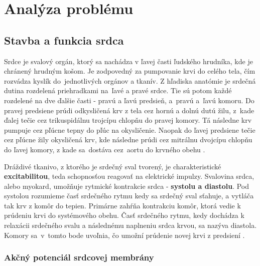 \chapter{Analýza problému}

\section{Stavba a funkcia srdca}

Srdce je svalový orgán, ktorý sa nachádza v ľavej časti ľudského hrudníka, kde je chránený hrudným košom. Je zodpovedný za pumpovanie krvi do celého tela, čím rozvádza kyslík do~jednotlivých orgánov a tkanív. Z hľadiska anatómie je srdečná dutina rozdelená priehradkami na~ľavé a pravé srdce. Tie sú potom každé rozdelené na dve ďalšie časti - pravú a ľavú predsieň, a~pravú a~ľavú komoru. Do pravej predsiene prúdi odkysličená krv z tela cez hornú a dolnú dutú žilu, z~kade ďalej tečie cez trikuspidálnu trojcípu chlopňu do pravej komory. Tá následne krv pumpuje cez pľúcne tepny do pľúc na okysličenie. Naopak do ľavej predsiene tečie cez pľúcne žily okysličená krv, kde následne prúdi cez mitrálnu dvojcípu chlopňu do ľavej komory, z kade sa~dostáva cez~aortu do krvného obehu \cite{Weinhaus}\cite{Britannica_2024}.

Dráždivé tkanivo, z ktorého je srdečný sval tvorený, je charakteristické \textbf{excitabilitou}, teda schopnosťou reagovať na elektrické impulzy. Svalovina srdca, alebo myokard, umožňuje rytmické kontrakcie srdca - \textbf{systolu a diastolu}. Pod systolou rozumieme časť srdečného rytmu kedy sa srdečný sval sťahuje, a vytláča tak krv z komôr do tepien. Primárne zahŕňa kontrakciu komôr, ktorá vedie k prúdeniu krvi do systémového obehu. Časť srdečného rytmu, kedy dochádza k relaxácii srdečného svalu a následnému naplneniu srdca krvou, sa nazýva diastola. Komory sa~v~tomto bode uvoľnia, čo umožní prúdenie novej krvi z predsiení \cite{Weinhaus}.

\subsection{Akčný potenciál srdcovej membrány}

